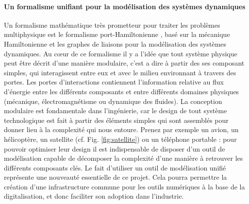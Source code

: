 \documentclass[12pt, french]{article}
\begin{document}
\paragraph{\large Un formalisme unifiant pour la modélisation des systèmes dynamiques\\}
Un formalisme mathématique très prometteur pour traiter les problèmes multiphysique est le formalisme port-Hamiltonienne \cite{vanderSchaft2002}, basé sur la mécanique Hamiltonienne et les graphes de liaisons pour la modélisation des systèmes dynamiques. Au c\oe{}ur de ce formalisme il y a l'idée que tout système physique peut être décrit d'une manière modulaire, c'est a dire à partir des ses composant simples, qui interagissent entre eux et avec le milieu environnant à travers des portes. Les portes d'interactions contiennent l'information relative au flux d'énergie entre les différents composants et entre différents domaines physiques (mécanique, électromagnétisme ou dynamique des fluides). La conception modulaire est fondamentale dans l'ingénierie, car le design de tout système technologique est fait à partir des éléments simples qui sont assemblés pour donner lieu à la complexité qui nous entoure. Prenez par exemple un avion, un hélicoptère, un satellite (cf. Fig. \ref{fig:satellite}) ou un téléphone portable : pour pouvoir optimiser leur design il est indispensable de disposer d'un outil de modélisation capable de décomposer la complexité d'une manière à retrouver les différents composants clés. Le fait d'utiliser un outil de modélisation unifié représente une nouveauté essentielle de ce projet. Cela pourra permettre la création d'une infrastructure commune pour les outils numériques à la base de la digitalisation, et donc faciliter son adoption dans l'industrie.
\end{document}
